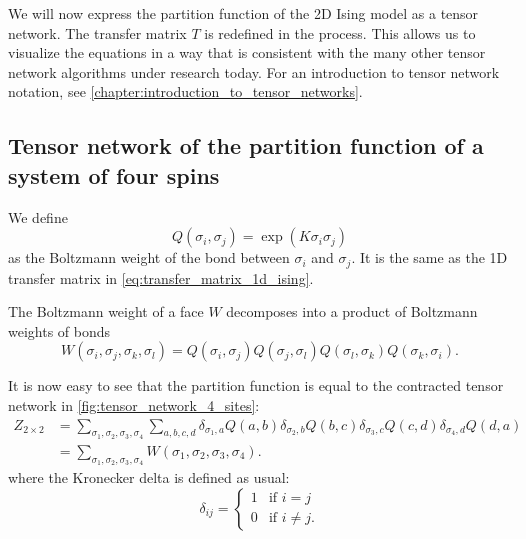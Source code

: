 We will now express the partition function of the 2D Ising model as a tensor network. The
transfer matrix $T$ is redefined in the process. This allows us to visualize the equations
in a way that is consistent with the many other tensor network algorithms under research
today. For an introduction to tensor network notation, see
\autoref{chapter:introduction_to_tensor_networks}.

\subsection{Tensor network of the partition function of a system of four spins}

We define
\begin{equation}
  Q(\sigma_i, \sigma_j) = \exp(K \sigma_i \sigma_j)
\end{equation}
as the Boltzmann weight of the bond between $\sigma_i$ and $\sigma_j$. It is the
same as the 1D transfer matrix in \autoref{eq:transfer_matrix_1d_ising}.

The Boltzmann weight of a face $W$ decomposes into a product of Boltzmann weights of
bonds
\begin{equation}
  W(\sigma_i, \sigma_j, \sigma_k, \sigma_l) =
  Q(\sigma_i, \sigma_j)Q(\sigma_j, \sigma_l)Q(\sigma_l, \sigma_k)Q(\sigma_k, \sigma_i).
\end{equation}

It is now easy to see that the partition function is equal to the contracted tensor
network in \autoref{fig:tensor_network_4_sites}:
\begin{equation}\label{eq:tensor_network_4_sites}
  \begin{split}
    Z_{2 \times 2} & =
    \sum_{\sigma_1, \sigma_2, \sigma_3, \sigma_4} \sum_{a, b, c, d}
    \delta_{\sigma_1, a} Q(a, b) \delta_{\sigma_2, b} Q(b, c)
    \delta_{\sigma_3, c} Q(c, d) \delta_{\sigma_4, d} Q(d, a) \\
    & =
    \sum_{\sigma_1, \sigma_2, \sigma_3, \sigma_4} W(\sigma_1, \sigma_2, \sigma_3, \sigma_4).
  \end{split}
\end{equation}
where the Kronecker delta is defined as usual:
\begin{equation}
  \delta_{i j} =
  \begin{cases}
    1 & \text{if } i = j \\
    0 & \text{if } i \neq j.
  \end{cases}
\end{equation}

